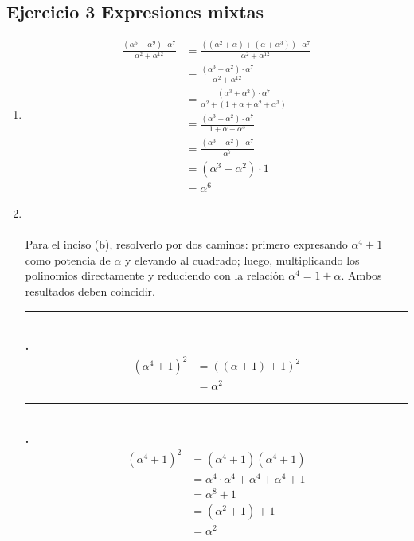 \documentclass[11pt,fleqn]{article}
\begin{document}
\subsection*{Ejercicio 3 Expresiones mixtas}
\begin{enumerate}[label=\alph*)]
\item {}
\begin{align*}
    \frac{(\alpha^5+\alpha^9)\cdot\alpha^7}{\alpha^2+\alpha^{12}}
    &=\frac{((\alpha^2+\alpha)+(\alpha+\alpha^3))\cdot\alpha^7}{\alpha^2+\alpha^{12}}\\
    &=\frac{(\alpha^3+\alpha^2)\cdot\alpha^7}{\alpha^2+\alpha^{12}}\\
    &=\frac{(\alpha^3+\alpha^2)\cdot\alpha^7}{\alpha^2+(1+\alpha+\alpha^2+\alpha^3)}\\
    &=\frac{(\alpha^3+\alpha^2)\cdot\alpha^7}{1+\alpha+\alpha^3}\\
    &=\frac{(\alpha^3+\alpha^2)\cdot\alpha^7}{\alpha^7}\\
    &=(\alpha^3+\alpha^2)\cdot1\\
    &=\alpha^6
\end{align*}

\item {}
\\ \\
Para el inciso (b), resolverlo por dos caminos: primero expresando $\alpha^4+1$ como potencia de $\alpha$ y elevando al cuadrado; luego, multiplicando los polinomios directamente y reduciendo con la
relación $\alpha^4=1+\alpha$. Ambos resultados deben coincidir.

\rule{4cm}{0.4pt}\\\textbf{\textbar {}.}
\begin{align*}
    (\alpha^4+1)^2
    &=((\alpha+1)+1)^2\\
    &=\alpha^2
\end{align*}
\rule{4cm}{0.4pt}\\\textbf{\textbar {}.}
\begin{align*}
    (\alpha^4+1)^2
    &=(\alpha^4+1)(\alpha^4+1)\\
    &=\alpha^4\cdot\alpha^4+\alpha^4+\alpha^4+1\\
    &=\alpha^8+1\\
    &=(\alpha^2+1)+1\\
    &=\alpha^2
\end{align*}
\end{enumerate}
\end{document}
